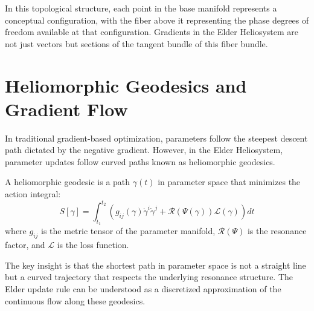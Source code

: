 In this topological structure, each point in the base manifold represents a conceptual configuration, with the fiber above it representing the phase degrees of freedom available at that configuration. Gradients in the Elder Heliosystem are not just vectors but sections of the tangent bundle of this fiber bundle.

\section{Heliomorphic Geodesics and Gradient Flow}

In traditional gradient-based optimization, parameters follow the steepest descent path dictated by the negative gradient. However, in the Elder Heliosystem, parameter updates follow curved paths known as heliomorphic geodesics.

\begin{definition}
A heliomorphic geodesic is a path $\gamma(t)$ in parameter space that minimizes the action integral:
\begin{equation}
S[\gamma] = \int_{t_1}^{t_2} \left( g_{ij}(\gamma) \dot{\gamma}^i \dot{\gamma}^j + \mathcal{R}(\Psi(\gamma)) \mathcal{L}(\gamma) \right) dt
\end{equation}
where $g_{ij}$ is the metric tensor of the parameter manifold, $\mathcal{R}(\Psi)$ is the resonance factor, and $\mathcal{L}$ is the loss function.
\end{definition}

The key insight is that the shortest path in parameter space is not a straight line but a curved trajectory that respects the underlying resonance structure. The Elder update rule can be understood as a discretized approximation of the continuous flow along these geodesics.

